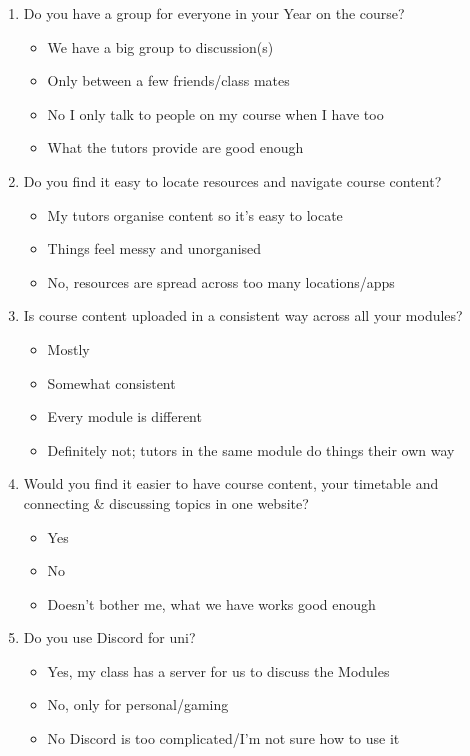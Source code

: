 \begin{enumerate}
    \item Do you have a group for everyone in your Year on the course?
    \begin{itemize}
        \item We have a big group to discussion(s)
        \item Only between a few friends/class mates
        \item No I only talk to people on my course when I have too
        \item What the tutors provide are good enough 
    \end{itemize}
    
    \item Do you find it easy to locate resources and navigate course content?
    \begin{itemize}
        \item My tutors organise content so it's easy to locate 
        \item Things feel messy and unorganised
        \item No, resources are spread across too many locations/apps 
    \end{itemize}
    
    \item Is course content uploaded in a consistent way across all your modules?
    \begin{itemize}
        \item Mostly
        \item Somewhat consistent 
        \item Every module is different 
        \item Definitely not; tutors in the same module do things their own way
    \end{itemize}
    
    \item Would you find it easier to have course content, your timetable and connecting \& discussing topics in one website?
    \begin{itemize}
        \item Yes
        \item No
        \item Doesn't bother me, what we have works good enough 
    \end{itemize}
    
    \item Do you use Discord for uni?
    \begin{itemize}
        \item Yes, my class has a server for us to discuss the Modules
        \item No, only for personal/gaming 
        \item No Discord is too complicated/I'm not sure how to use it 
    \end{itemize}
    

\end{enumerate}
